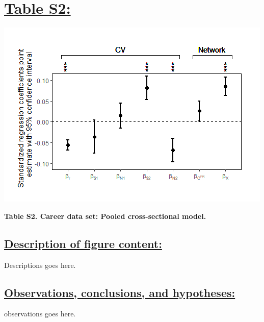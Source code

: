 \documentclass{article}\usepackage[]{graphicx}\usepackage[]{color}
\begin{document}
\section*{\underline{Table S2:}}
\begin{center}
\includegraphics[scale=0.5]{4.png}
\newline
\par{\textbf{Table S2. Career data set: Pooled cross-sectional model.}}
\end{center}
\subsection*{\underline{Description of figure content:}}
\par{
Descriptions goes here.
}
\subsection*{\underline{Observations, conclusions, and hypotheses:}}
\par{
observations goes here.
}

\newpage
\end{document}
